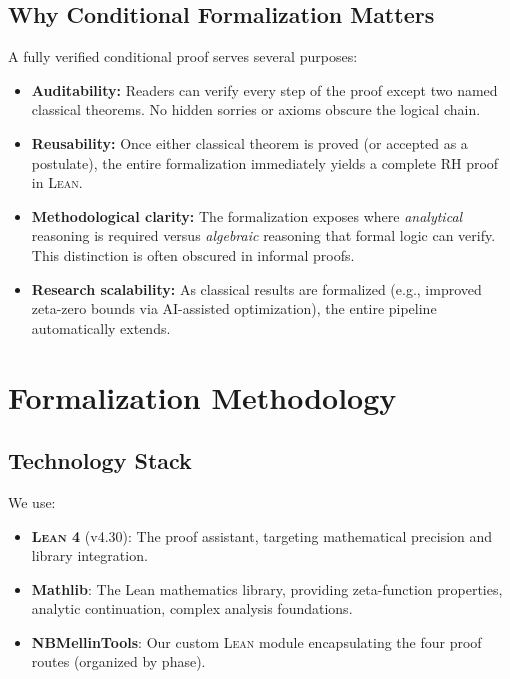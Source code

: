 \documentclass[11pt,a4paper]{article}
\newcommand{\Lean}{\textsc{Lean}\xspace}
\begin{document}
\subsection{Why Conditional Formalization Matters}

A fully verified conditional proof serves several purposes:

\begin{itemize}
  \item \textbf{Auditability:} Readers can verify every step of the proof except two named classical theorems. No hidden sorries or axioms obscure the logical chain.

  \item \textbf{Reusability:} Once either classical theorem is proved (or accepted as a postulate), the entire formalization immediately yields a complete RH proof in \Lean.

  \item \textbf{Methodological clarity:} The formalization exposes where \emph{analytical} reasoning is required versus \emph{algebraic} reasoning that formal logic can verify. This distinction is often obscured in informal proofs.

  \item \textbf{Research scalability:} As classical results are formalized (e.g., improved zeta-zero bounds via AI-assisted optimization), the entire pipeline automatically extends.
\end{itemize}

\section{Formalization Methodology}
\label{sec:methodology}

\subsection{Technology Stack}

We use:
\begin{itemize}
  \item \textbf{\Lean 4} (v4.30): The proof assistant, targeting mathematical precision and library integration.
  \item \textbf{Mathlib}: The Lean mathematics library, providing zeta-function properties, analytic continuation, complex analysis foundations.
  \item \textbf{NBMellinTools}: Our custom \Lean module encapsulating the four proof routes (organized by phase).
\end{itemize}
\end{document}
